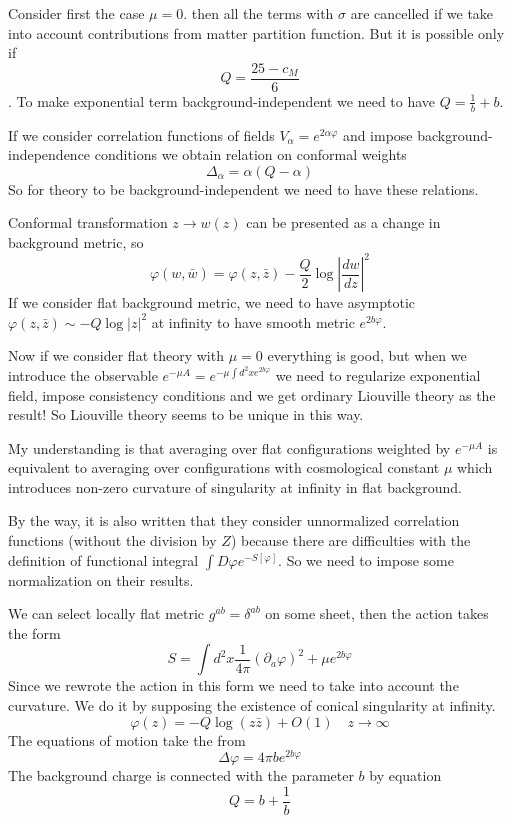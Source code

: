 \documentclass[12pt]{article}
\begin{document}
Consider first the case $\mu=0$.
then all the terms with $\sigma$ are cancelled if we take into account contributions from matter
partition function. But it is possible only if 
$$Q=\frac{25-c_{M}}{6}$$. 
To make exponential term background-independent we need to have $Q=\frac{1}{b}+b$. 

If we consider correlation functions of fields $V_{\alpha}=e^{2\alpha\varphi}$ and impose
background-independence conditions we obtain relation on conformal weights
$$\Delta_{\alpha}=\alpha(Q-\alpha)$$
So for theory to be background-independent we need to have these relations. 

Conformal transformation $z\to w(z)$ can be presented as a change in background metric, so 
$$\varphi(w,\bar w) = \varphi(z,\bar z) -\frac{Q}{2}\log \left|\frac{dw}{dz}\right|^{2}$$
If we consider flat background metric, we need to have asymptotic $\varphi(z,\bar z)\sim -Q \log
|z|^{2}$ at infinity to have smooth metric $e^{2b\varphi}$. 


Now if we consider flat theory with $\mu=0$ everything is good, but when we introduce the observable
$e^{-\mu A}=e^{-\mu \int d^{2}x e^{2b\varphi}}$ we need to regularize exponential field, impose
consistency conditions and we get ordinary Liouville theory as the result! 
So Liouville theory seems to be unique in this way. 

My understanding is that averaging over flat configurations weighted by $e^{-\mu A}$ is equivalent
to averaging over configurations with cosmological constant $\mu$ which introduces non-zero
curvature of singularity at infinity in flat background. 

By the way, it is also written that they consider unnormalized correlation functions (without the
division by $Z$) because there are difficulties with the definition of functional integral $\int
D\varphi e^{-S[\varphi]}$. 
So we need to impose some normalization on their results. 

We can select locally flat metric $g^{ab}=\delta^{ab}$ on some sheet, then the action takes the form
\begin{equation}
  \label{eq:14}
  S= \int d^{2}x \frac{1}{4\pi} (\partial_{a} \varphi)^{2}+\mu e^{2b\varphi}
\end{equation}
Since we rewrote the action in this form we need to take into account the curvature. We do it by
supposing the existence of conical singularity at infinity.
\begin{equation}
  \label{eq:15}
  \varphi(z)=-Q \log (z\bar z)+O(1) \quad z\to\infty
\end{equation}
The equations of motion take the from
\begin{equation}
  \label{eq:18}
  \Delta \varphi = 4\pi b e^{2b\varphi}
\end{equation}
The background charge is connected with the parameter $b$ by equation
\begin{equation}
  \label{eq:20}
  Q=b+\frac{1}{b}
\end{equation}
\end{document}
